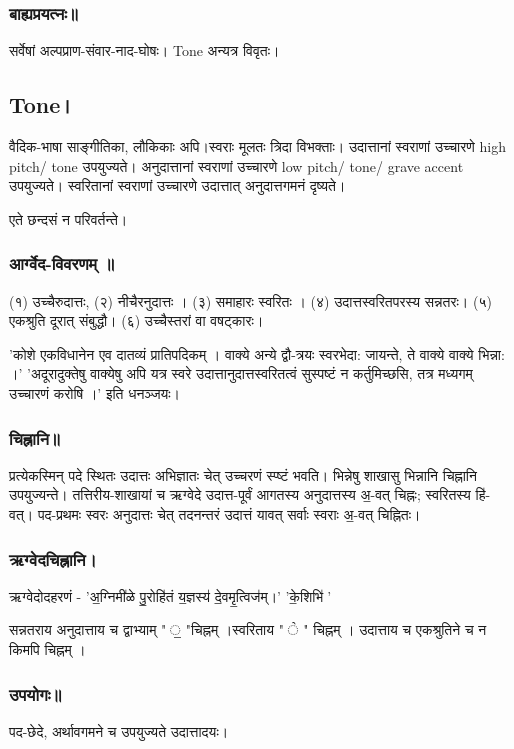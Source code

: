 \documentclass[oneside, article]{memoir}
\begin{document}
\subsubsection{बाह्यप्रयत्नः॥}
सर्वेषां अल्पप्राण-संवार-नाद-घोषः। Tone अन्यत्र विवृतः।

\subsection{Tone।}
वैदिक-भाषा साङ्गीतिका, लौकिकाः अपि।स्वराः मूलतः त्रिदा विभक्ताः। उदात्तानां स्वराणां उच्चारणे high pitch/ tone उपयुज्यते। अनुदात्तानां स्वराणां उच्चारणे low pitch/ tone/ grave accent उपयुज्यते। स्वरितानां स्वराणां उच्चारणे उदात्तात् अनुदात्तगमनं दृष्यते।

एते छन्दसं न परिवर्तन्ते। 

\subsubsection{आर्ग्वेद-विवरणम् ॥}
(१) उच्चैरुदात्तः, (२) नीचैरनुदात्तः । (३) समाहारः स्वरितः । (४) उदात्तस्वरितपरस्य सन्नतरः। (५) एकश्रुति दूरात् संबुद्धौ। (६) उच्चैस्तरां वा वषट्कारः। 

'कोशे एकविधानेन एव दातव्यं प्रातिपदिकम् । वाक्ये अन्ये द्वौ-त्रयः स्वरभेदा: जायन्ते, ते वाक्ये वाक्ये भिन्ना: ।' 'अदूरादुक्तेषु वाक्येषु अपि यत्र स्वरे उदात्तानुदात्तस्वरितत्वं सुस्पष्टं न कर्तुमिच्छसि, तत्र मध्यगम् उच्चारणं करोषि ।' इति धनञ्जयः।

\subsubsection{चिह्नानि॥}
प्रत्येकस्मिन् पदे स्थितः उदात्तः अभिज्ञातः चेत् उच्चरणं स्प्ष्टं भवति। भिन्नेषु शाखासु भिन्नानि चिह्नानि उपयुज्यन्ते। तत्तिरीय-शाखायां च ऋग्वेदे उदात्त-पूर्वं आगतस्य अनुदात्तस्य अ॒-वत् चिह्नः; स्वरितस्य हि॑-वत्। पद-प्रथमः स्वरः अनुदात्तः चेत् तदनन्तरं उदात्तं यावत् सर्वाः स्वराः अ॒-वत् चिह्नितः।

\subsubsection{ऋग्वेदचिह्नानि।}
ऋग्वेदोदहरणं - 'अ॒ग्निमी॑ळे पु॒रोहि॑तं य॒ज्ञस्य॑ दे॒वमृ॒त्विज॑म्।' 'के॒शिभि॑'

सन्नतराय अनुदात्ताय च द्वाभ्याम् " ॒ "चिह्नम् ।स्वरिताय "  ॓ " चिह्नम् । उदात्ताय च एकश्रुतिने च न किमपि चिह्नम् ।



\subsubsection{उपयोगः॥}
पद-छेदे, अर्थावगमने च उपयुज्यते उदात्तादयः।
\end{document}
